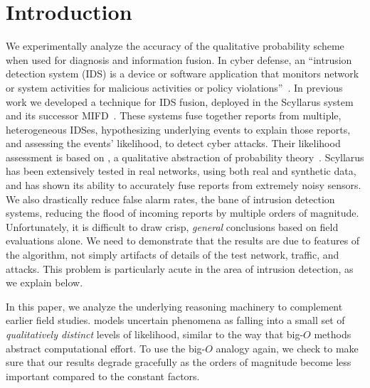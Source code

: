 \section{Introduction}
\label{sec:introduction}

We experimentally analyze the accuracy of the \zplus qualitative
probability scheme when used for diagnosis and information fusion.
In cyber defense, an ``intrusion detection system (IDS) is a device or
software application that monitors network or system activities for malicious
activities or policy violations''~\cite{wiki:ids}.
In previous work we developed a technique for IDS
fusion, deployed in the Scyllarus system~ and its
successor MIFD~.
These systems fuse together reports from multiple, heterogeneous IDSes,
hypothesizing underlying events to explain those reports, and assessing the events'
likelihood, to detect cyber attacks.
Their likelihood assessment is based on \zplus, a qualitative
abstraction of probability theory~\cite{Goldszmidt:96}.
Scyllarus has been extensively tested in real networks, using both
real and synthetic data, and has shown its ability to accurately fuse reports
from extremely noisy sensors. 
We also
drastically reduce false alarm rates, the bane of intrusion
detection systems, reducing the flood of incoming reports by multiple
orders of magnitude.
Unfortunately, it is difficult to draw crisp, \emph{general} conclusions based on
field evaluations alone.
We need to demonstrate that the results are due to features of the algorithm,
not simply artifacts of details of the test network, traffic, and
attacks.  This problem is particularly acute in the area of intrusion detection,
as we explain below.
%

In this paper, we analyze the underlying reasoning machinery to
complement earlier field studies.
%
\zplus models uncertain phenomena as falling into a small set of
\emph{qualitatively distinct} levels of likelihood, similar to the way that
big-$O$ methods abstract computational effort.
To use the big-$O$ analogy again, we check to make sure that our results degrade
gracefully as the orders of magnitude become less important compared to the
constant factors.

